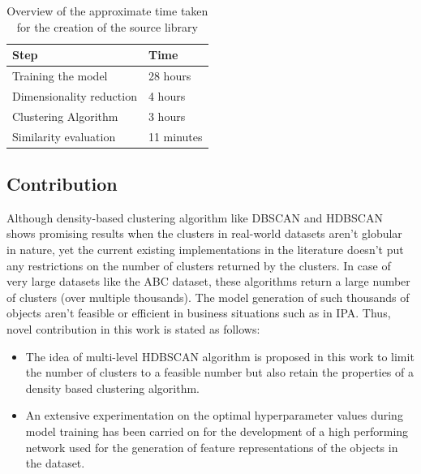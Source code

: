 \begin{table}[ht]
  \caption{Overview of the approximate time taken for the creation of the source library}
  \label{tab:overview_time}
  \centering
  \begin{tabular}{|l|l|}
    \toprule
    Step & Time \\
    \midrule
    Training the model & 28 hours\\
    Dimensionality reduction & 4 hours \\        
    Clustering Algorithm & 3 hours \\
    Similarity evaluation & 11 minutes\\
    \bottomrule
  \end{tabular}
\end{table}
\subsection{Contribution}
Although density-based clustering algorithm like \ac{DBSCAN} and \ac{HDBSCAN} shows promising results when the clusters in real-world datasets aren't globular in nature, yet the current existing implementations in the literature doesn't put any restrictions on the number of clusters returned by the clusters. In case of very large datasets like the ABC dataset\cite{Koch_2019_CVPR}, these algorithms return a large number of clusters (over multiple thousands). The model generation of such thousands of objects aren't feasible or efficient in business situations such as in \ac{IPA}. Thus, novel contribution in this work is stated as follows:
\begin{itemize}
  \item The idea of multi-level \ac{HDBSCAN} algorithm is proposed in this work to limit the number of clusters to a feasible number but also retain the properties of a density based clustering algorithm.
  \item An extensive experimentation on the optimal hyperparameter values during model training has been carried on for the development of a high performing network used for the generation of feature representations of the objects in the dataset.
\end{itemize}
